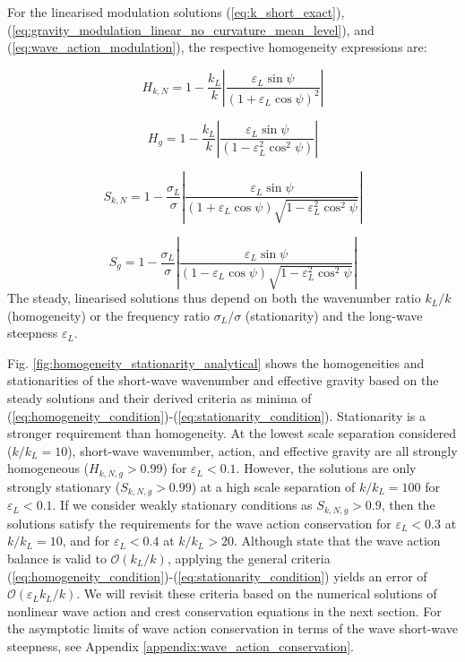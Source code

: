 \documentclass[lineno]{jfm}
\begin{document}
For the linearised modulation solutions (\ref{eq:k_short_exact}),
(\ref{eq:gravity_modulation_linear_no_curvature_mean_level}), and
(\ref{eq:wave_action_modulation}), the respective homogeneity expressions are:

\begin{equation}
  H_{k,N} = 1 - \frac{k_L}{k} \left| \frac{\varepsilon_L \sin{\psi}}{\left(1 + \varepsilon_L \cos{\psi}\right)^2} \right|
  \label{eq:homogeneity_k}
\end{equation}

\begin{equation}
  H_{g} = 1 - \frac{k_L}{k} \left| \frac{\varepsilon_L \sin{\psi}}{\left(1 - \varepsilon_L^2 \cos^2{\psi}\right)} \right|
  \label{eq:homogeneity_g}
\end{equation}

\begin{equation}
  S_{k,N} = 1 - \frac{\sigma_L}{\sigma} \left| \frac{\varepsilon_L \sin{\psi}}{\left(1 + \varepsilon_L \cos{\psi}\right) \sqrt{1 - \varepsilon_L^2 \cos^2{\psi}}} \right|
  \label{eq:stationarity_k}
\end{equation}

\begin{equation}
  S_{g} = 1 - \frac{\sigma_L}{\sigma} \left| \frac{\varepsilon_L \sin{\psi}}{\left(1 - \varepsilon_L \cos{\psi}\right) \sqrt{1 - \varepsilon_L^2 \cos^2{\psi}}} \right|
  \label{eq:stationarity_g}
\end{equation}
The steady, linearised solutions thus depend on both the wavenumber ratio
$k_L/k$ (homogeneity) or the frequency ratio $\sigma_L/\sigma$ (stationarity)
and the long-wave steepness $\varepsilon_L$.

Fig. \ref{fig:homogeneity_stationarity_analytical} shows the homogeneities and
stationarities of the short-wave wavenumber and effective gravity based on
the steady solutions and their derived criteria as minima of
(\ref{eq:homogeneity_condition})-(\ref{eq:stationarity_condition}).
Stationarity is a stronger requirement than homogeneity.
At the lowest scale separation considered ($k/k_L = 10$), short-wave wavenumber,
action, and effective gravity are all strongly homogeneous ($H_{k,N,g} > 0.99$)
for $\varepsilon_L < 0.1$.
However, the solutions are only strongly stationary ($S_{k,N,g} > 0.99$) at a
high scale separation of $k/k_L = 100$ for $\varepsilon_L < 0.1$.
If we consider weakly stationary conditions as $S_{k,N,g} > 0.9$, then the
solutions satisfy the requirements for the wave action conservation for
$\varepsilon_L < 0.3$ at $k/k_L = 10$, and for $\varepsilon_L < 0.4$ at
$k/k_L > 20$.
Although \citet{bretherton1968wavetrains} state that the wave action balance
is valid to $\mathcal{O}(k_L/k)$, applying the general criteria
(\ref{eq:homogeneity_condition})-(\ref{eq:stationarity_condition}) yields an
error of $\mathcal{O}(\varepsilon_L k_L/k)$.
We will revisit these criteria based on the numerical solutions of nonlinear
wave action and crest conservation equations in the next section.
For the asymptotic limits of wave action conservation in terms of the wave
short-wave steepness, see Appendix \ref{appendix:wave_action_conservation}.
\end{document}
